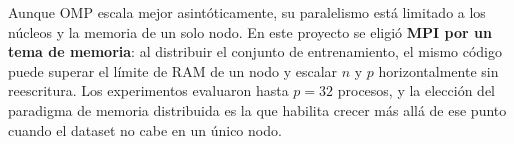 Aunque OMP escala mejor asintóticamente, su paralelismo está limitado a los núcleos y la memoria
de un solo nodo. En este proyecto se eligió \textbf{MPI por un tema de memoria}: al distribuir el
conjunto de entrenamiento, el mismo código puede superar el límite de RAM de un nodo y escalar
$n$ y $p$ horizontalmente sin reescritura. Los experimentos evaluaron hasta $p=32$ procesos, y la
elección del paradigma de memoria distribuida es la que habilita crecer más allá de ese punto
cuando el dataset no cabe en un único nodo.


